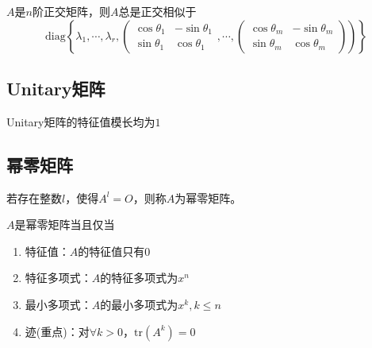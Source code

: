 \begin{theorem}[$n$阶正交矩阵的标准型]
  $A$是$n$阶正交矩阵，则$A$总是正交相似于
  \begin{equation*}
    \mathrm{diag} \left\{ \lambda_1,\cdots,\lambda_r, \left(
        \begin{array}{cc}
          \cos \theta_1&- \sin \theta_1 \\
                       \sin \theta_1&\cos \theta_1
        \end{array}
        ,\cdots,
        \left(
          \begin{array}{cc}
            \cos \theta_m&- \sin \theta_m \\
                         \sin \theta_m& \cos \theta_m
          \end{array}
        \right)
      \right) \right\}
  \end{equation*}
\end{theorem}


\subsection{Unitary矩阵}

\begin{theorem}[Unitary矩阵的性质]
  Unitary矩阵的特征值模长均为$1$
\end{theorem}




\subsection{幂零矩阵}

\begin{definition}[幂零矩阵]
  若存在整数$l$，使得$A^l = O$，则称$A$为幂零矩阵。
\end{definition}

\begin{theorem}[幂零矩阵充要条件]
  $A$是幂零矩阵当且仅当
  \begin{enumerate}
  \item 特征值：$A$的特征值只有$0$
  \item 特征多项式：$A$的特征多项式为$x^n$
  \item 最小多项式：$A$的最小多项式为$x^k, k \leq n$
  \item 迹(重点)：对$\forall k > 0$，$\mathrm{tr}(A^k) = 0$
  \end{enumerate}
\end{theorem}




